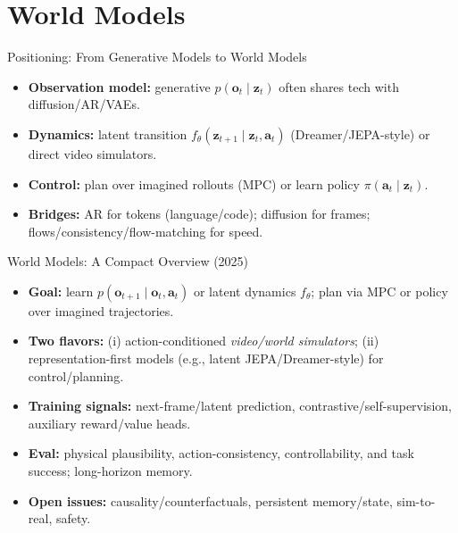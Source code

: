 \documentclass[aspectratio=169]{beamer}
\begin{document}
\section{World Models}

\begin{frame}{Positioning: From Generative Models to World Models}
\small
\begin{itemize}
  \item \textbf{Observation model:} generative $p(\mathbf{o}_t \mid \mathbf{z}_t)$ often shares tech with diffusion/AR/VAEs.
  \item \textbf{Dynamics:} latent transition $f_\theta(\mathbf{z}_{t+1}\mid\mathbf{z}_t, \mathbf{a}_t)$ (Dreamer/JEPA-style) or direct video simulators.
  \item \textbf{Control:} plan over imagined rollouts (MPC) or learn policy $\pi(\mathbf{a}_t\mid\mathbf{z}_t)$.
  \item \textbf{Bridges:} AR for tokens (language/code); diffusion for frames; flows/consistency/flow-matching for speed.
\end{itemize}
\end{frame}

\begin{frame}{World Models: A Compact Overview (2025)}
\vspace{0.5em}
\begin{itemize}
  \item \textbf{Goal:} learn $p(\mathbf{o}_{t+1}\mid\mathbf{o}_t,\mathbf{a}_t)$ or latent dynamics $f_\theta$; plan via MPC or policy over imagined trajectories.
  \item \textbf{Two flavors:} (i) action-conditioned \emph{video/world simulators}; (ii) representation-first models (e.g., latent JEPA/Dreamer-style) for control/planning.
  \item \textbf{Training signals:} next-frame/latent prediction, contrastive/self-supervision, auxiliary reward/value heads.
  \item \textbf{Eval:} physical plausibility, action-consistency, controllability, and task success; long-horizon memory.
  \item \textbf{Open issues:} causality/counterfactuals, persistent memory/state, sim-to-real, safety.
\end{itemize}
\end{frame}
\end{document}
